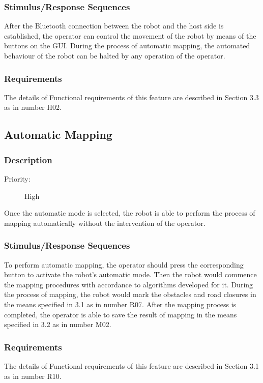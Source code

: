 \documentclass[titlepage]{article}
\begin{document}
\subsubsection{Stimulus/Response Sequences}
After the Bluetooth connection between the robot and the host side is established, the operator can control the movement of the robot by means of the buttons on the GUI. During the process of automatic mapping, the automated behaviour of the robot can be halted by any operation of the operator.

\subsubsection{Requirements}
The details of Functional requirements of this feature are described in Section 3.3 as in number H02.


\subsection{Automatic Mapping}
\subsubsection{Description}
\begin{description}
\item[Priority: ] High
\end{description}
Once the automatic mode is selected, the robot is able to perform the process of mapping automatically without the intervention of the operator.

\subsubsection{Stimulus/Response Sequences}
To perform automatic mapping, the operator should press the corresponding button to activate the robot’s automatic mode. Then the robot would commence the mapping procedures with accordance to algorithms developed for it. During the process of mapping, the robot would mark the obstacles and road closures in the means specified in 3.1 as in number R07. After the mapping process is completed, the operator is able to save the result of mapping in the means specified in 3.2 as in number M02.

\subsubsection{Requirements}
The details of Functional requirements of this feature are described in Section 3.1 as in number R10.
\end{document}

